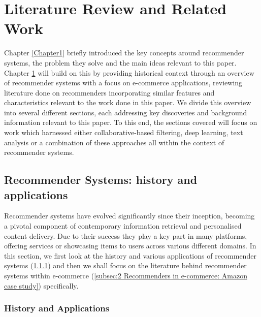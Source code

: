 
\chapter{Literature Review and Related Work} %

\label{Chapter2} %

Chapter \ref{Chapter1} briefly introduced the key concepts around recommender systems, the problem they solve and the main ideas relevant to this paper. Chapter \ref{Chapter2} will build on this by providing historical context through an overview of recommender systems with a focus on e-commerce applications, reviewing literature done on recommenders incorporating similar features and characteristics relevant to the work done in this paper. We divide this overview into several different sections, each addressing key discoveries and background information relevant to this paper. To this end, the sections covered will focus on work which harnessed either collaborative-based filtering, deep learning, text analysis or a combination of these approaches all within the context of recommender systems.

\section{Recommender Systems: history and applications}
\label{sec:2 Recommender Systems: history and applications}

Recommender systems have evolved significantly since their inception, becoming a pivotal component of contemporary information retrieval and personalised content delivery. Due to their success they play a key part in many platforms, offering services or showcasing items to users across various different domains. In this section, we first look at the history and various applications of recommender systems (\ref{subsec:2 History and Applications}) and then we shall focus on the literature behind recommender systems within e-commerce (\ref{subsec:2 Recommenders in e-commerce: Amazon case study}) specifically. 


\subsection{History and Applications}
\label{subsec:2 History and Applications}

